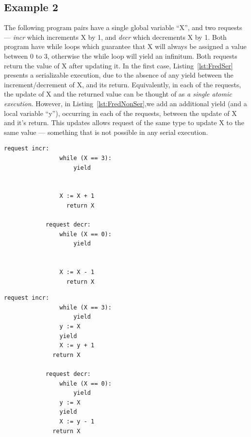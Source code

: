 \subsection{Example 2}

The following program pairs have a single global variable ``X'', and two requests --- \textit{incr} which increments X by 1, and \textit{decr} which decrements X by 1. Both program have while loops which guarantee that X will always be assigned a value between 0 to 3, otherwise the while loop will yield an infinitum. Both requests return the value of X after updating it.
%
In the first case, Listing~\ref{lst:FredSer} presents a serializable execution, due to the absence of any yield between the increment/decrement of X, and its return. Equivalently, in each of the requests, the update of X and the returned value can be thought of as \textit{a single atomic execution}.
%
However, in Listing~\ref{lst:FredNonSer},we add an additional yield (and a local variable ``y''), occurring in each of the requests, between the update of X and it's return.
%
This updates allows request of the same type to update X to the same value --- something that is not possible in any serial execution. 


\noindent
\begin{minipage}[t]{0.45\textwidth}
	\begin{lstlisting}[caption={Fred (serializable)},
		label={lst:FredSer}]
			request incr: 
			    while (X == 3):
			        yield
			        
			        
			    X := X + 1
				  return X		
			
			request decr: 
			    while (X == 0): 
			        yield
			        
			        
			    X := X - 1
				  return X
		\end{lstlisting}
\end{minipage}
\hfill
\begin{minipage}[t]{0.45\textwidth}
	\begin{lstlisting}[caption={Fred2 (not serializable)},
		label={lst:FredNonSer}]
			request incr:
			    while (X == 3):
			        yield
			    y := X
			    yield
			    X := y + 1
		      return X		
			
			request decr: 
			    while (X == 0):
			        yield
			    y := X
			    yield
			    X := y - 1
		      return X
		\end{lstlisting}
\end{minipage}
	
